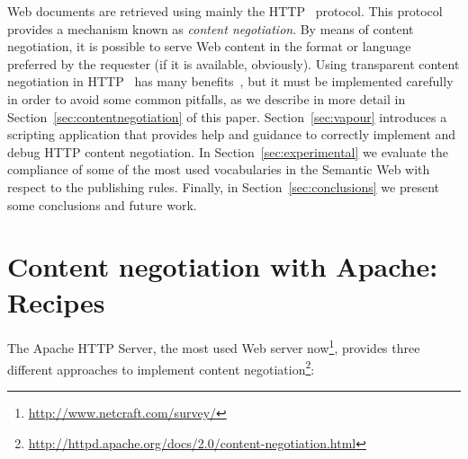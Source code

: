 \documentclass{../templates/llncs}
\begin{document}
Web documents are retrieved using mainly the HTTP~\cite{HTTP} 
protocol. This protocol provides a mechanism known as \textit{content negotiation}. 
By means of content negotiation, it is possible to serve Web content in the format or 
language preferred by the requester (if it is available, obviously). Using transparent content negotiation 
in HTTP~\cite{Holtman1998} has many benefits~\cite{Seshan1998}, but it must be 
implemented carefully in order to avoid some common pitfalls, as we describe in more detail in 
Section~\ref{sec:contentnegotiation} of this paper. Section~\ref{sec:vapour} introduces 
a scripting application that provides help and guidance to correctly implement and debug
HTTP content negotiation. In Section~\ref{sec:experimental} we evaluate the
compliance of some of the most used
vocabularies in the Semantic Web with respect to the publishing rules. Finally, in Section~\ref{sec:conclusions} we present 
some conclusions and future work.


\section{\label{sec:contentnegotiation}Content negotiation with Apache: Recipes}


The Apache HTTP Server, the most used Web server
now\footnote{\url{http://www.netcraft.com/survey/}}, 
provides three different approaches to implement content negotiation\footnote{\url{http://httpd.apache.org/docs/2.0/content-negotiation.html}}:
\end{document}
